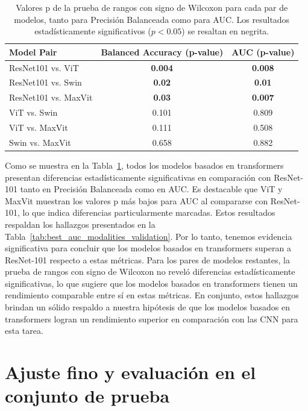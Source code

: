 \documentclass[a4paper,10pt]{book}
\begin{document}
\begin{table}[h!]
  \centering
    \caption[Valores p de la prueba de rangos con signo de Wilcoxon para cada par de modelos.]{Valores p de la prueba de rangos con signo de Wilcoxon para cada par de modelos, tanto para Precisión Balanceada como para AUC. Los resultados estadísticamente significativos ($p < 0.05$) se resaltan en negrita.}
  \label{tab:wilcoxon_pvalues}
  \begin{tabular}{@{}lcc@{}}
    \toprule
    \textbf{Model Pair} & \textbf{Balanced Accuracy (p-value)} & \textbf{AUC (p-value)} \\
    \midrule
    ResNet101 vs. ViT      & \textbf{0.004} & \textbf{0.008} \\
    ResNet101 vs. Swin     & \textbf{0.02} & \textbf{0.01} \\
    ResNet101 vs. MaxVit   & \textbf{0.03} & \textbf{0.007} \\
    ViT vs. Swin           & 0.101 & 0.809 \\
    ViT vs. MaxVit         & 0.111 & 0.508 \\
    Swin vs. MaxVit        & 0.658 & 0.882 \\
    \bottomrule
  \end{tabular}
\end{table}

Como se muestra en la Tabla~\ref{tab:wilcoxon_pvalues}, todos los modelos basados en transformers presentan diferencias estadísticamente significativas en comparación con ResNet-101 tanto en Precisión Balanceada como en AUC. Es destacable que ViT y MaxVit muestran los valores p más bajos para AUC al compararse con ResNet-101, lo que indica diferencias particularmente marcadas. Estos resultados respaldan los hallazgos presentados en la Tabla~\ref{tab:best_auc_modalities_validation}. Por lo tanto, tenemos evidencia significativa para concluir que los modelos basados en transformers superan a ResNet-101 respecto a estas métricas. Para los pares de modelos restantes, la prueba de rangos con signo de Wilcoxon no reveló diferencias estadísticamente significativas, lo que sugiere que los modelos basados en transformers tienen un rendimiento comparable entre sí en estas métricas. En conjunto, estos hallazgos brindan un sólido respaldo a nuestra hipótesis de que los modelos basados en transformers logran un rendimiento superior en comparación con las CNN para esta tarea.

\section{Ajuste fino y evaluación en el conjunto de prueba}
\end{document}
